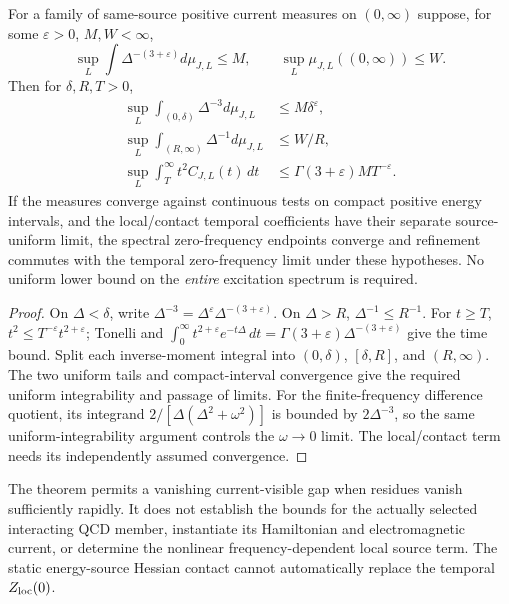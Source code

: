 \documentclass[12pt,a4paper]{article}
\begin{document}
\begin{theorem}
\label{p12:thm:v356-uniform-current-moment}
For a family of same-source positive current measures on
$(0,\infty)$ suppose, for some $\varepsilon>0$, $M,W<\infty$,
\[
 \sup_L\int\Delta^{-(3+\varepsilon)}d\mu_{J,L}\le M,
 \qquad \sup_L\mu_{J,L}((0,\infty))\le W.
\]
Then for $\delta,R,T>0$,
\begin{align*}
 \sup_L\int_{(0,\delta)}\Delta^{-3}d\mu_{J,L}
      &\le M\delta^\varepsilon,\\
 \sup_L\int_{(R,\infty)}\Delta^{-1}d\mu_{J,L}
      &\le W/R,\\
 \sup_L\int_T^\infty t^2C_{J,L}(t)\,dt
      &\le\Gamma(3+\varepsilon)M T^{-\varepsilon}.
\end{align*}
If the measures converge against continuous tests on compact positive
energy intervals, and the local/contact temporal coefficients have
their separate source-uniform limit, the spectral zero-frequency
endpoints converge and refinement commutes with the temporal
zero-frequency limit under these hypotheses.  No uniform lower
bound on the \emph{entire} excitation spectrum is required.
\end{theorem}
\begin{proof}
On $\Delta<\delta$, write
$\Delta^{-3}=\Delta^\varepsilon
\Delta^{-(3+\varepsilon)}$.  On $\Delta>R$,
$\Delta^{-1}\le R^{-1}$.  For $t\ge T$,
$t^2\le T^{-\varepsilon}t^{2+\varepsilon}$; Tonelli and
$\int_0^\infty t^{2+\varepsilon}e^{-t\Delta}\,dt
=\Gamma(3+\varepsilon)\Delta^{-(3+\varepsilon)}$
give the time bound.  Split each inverse-moment integral into
$(0,\delta)$, $[\delta,R]$, and $(R,\infty)$.
The two uniform tails and compact-interval convergence give the
required uniform integrability and passage of limits.
For the finite-frequency difference quotient, its integrand
$2/[\Delta(\Delta^2+\omega^2)]$ is bounded by
$2\Delta^{-3}$, so the same uniform-integrability argument
controls the $\omega\to0$ limit.  The local/contact term needs
its independently assumed convergence.
\end{proof}

\begin{remark}
\label{p12:rem:v356-current-physical-endpoint}
The theorem permits a vanishing current-visible gap when residues
vanish sufficiently rapidly.  It does not establish the bounds for
the actually selected interacting QCD member, instantiate its
Hamiltonian and electromagnetic current, or determine the nonlinear
frequency-dependent local source term.  The static energy-source
Hessian contact cannot automatically replace the temporal
$Z_{\rm loc}(0)$.
\end{remark}
\end{document}
